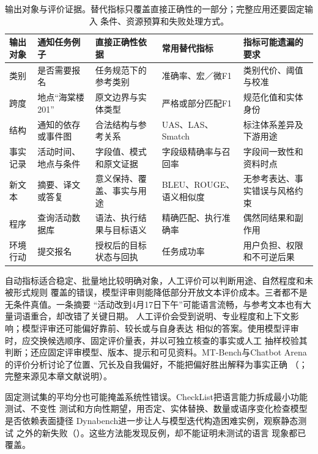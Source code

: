 \begin{table}[htbp]
  \centering
  \begin{tabularx}{\linewidth}{@{}p{19mm}p{28mm}p{35mm}p{35mm}X@{}}
    \toprule
    输出对象 & 通知任务例子 & 直接正确性依据 & 常用替代指标 & 指标可能遗漏的要求 \\
    \midrule
    类别 & 是否需要报名 & 任务规范下的参考类别 & 准确率、宏／微F1 & 类别代价、阈值与校准 \\
    跨度 & 地点“海棠楼201” & 原文边界与实体类型 & 严格或部分匹配F1 & 规范化值和实体身份 \\
    结构 & 通知的依存或事件图 & 合法结构与参考关系 & UAS、LAS、Smatch & 标注体系差异及下游用途 \\
    事实记录 & 活动时间、地点与条件 & 字段值、模式和原文证据 & 字段级精确率与召回率 & 字段间一致性和资料时点 \\
    新文本 & 摘要、译文或答复 & 意义保持、覆盖、事实与用途 & BLEU、ROUGE、语义相似度 & 无参考表达、事实错误与风格约束 \\
    程序 & 查询活动数据库 & 语法、执行结果与目标语义 & 精确匹配、执行准确率 & 偶然同结果和副作用 \\
    环境行动 & 提交报名 & 授权后的目标状态与回执 & 任务成功率 & 用户负担、权限和不可逆后果 \\
    \bottomrule
  \end{tabularx}
  \caption{输出对象与评价证据。替代指标只覆盖直接正确性的一部分；完整应用还要固定输入
  条件、资源预算和失败处理方式。}
  \label{tab:nlp-output-evidence}
\end{table}

自动指标适合稳定、批量地比较明确对象，人工评价可以判断用途、自然程度和未被形式规则
覆盖的错误，模型评审则能降低部分开放文本评价成本。三者都不是无条件真值。一条摘要
“活动改到4月17日下午”可能语言流畅，与参考文本也有大量词语重合，却改错了关键日期。
人工评价会受到说明、专业程度和上下文影响；模型评审还可能偏好靠前、较长或与自身表达
相似的答案。使用模型评审时，应交换候选顺序、固定评价量表，并以可独立核查的事实或人工
抽样校验其判断；还应固定评审模型、版本、提示和可见资料。MT-Bench与Chatbot Arena
的评价分析讨论了位置、冗长及自我偏好，不能把偏好胜出解释为事实正确
（\citeyear{nlp-intro-zheng2023judge}；完整来源见本章文献说明）。

固定测试集的平均分也可能掩盖系统性错误。CheckList把语言能力拆成最小功能测试、不变性
测试和方向性期望，用否定、实体替换、数量或语序变化检查模型是否依赖表面捷径
Dynabench进一步让人与模型迭代构造困难实例，观察静态测试
之外的新失败（\citeyear{kiela2021dynabench}）。这些方法能发现反例，却不能证明未测试的语言
现象都已覆盖。

